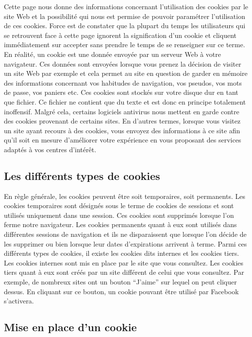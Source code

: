 Cette page nous donne des informations concernant l’utilisation des cookies par le site Web et la possibilité qui nous est permise de pouvoir paramétrer l’utilisation de ces cookies. Force est de constater que la plupart du temps les utilisateurs qui se retrouvent face à cette page ignorent la signification d’un cookie et cliquent immédiatement sur accepter sans prendre le temps de se renseigner sur ce terme. En réalité, un cookie est une donnée envoyée par un serveur Web à votre navigateur. Ces données sont envoyées lorsque vous prenez la décision de visiter un site Web par exemple et cela permet au site en question de garder en mémoire des informations concernant vos habitudes de navigation, vos pseudos, vos mots de passe, vos paniers etc. Ces cookies sont stockés sur votre disque dur en tant que fichier. Ce fichier ne contient que du texte et est donc en principe totalement inoffensif. Malgré cela, certains logiciels antivirus nous mettent en garde contre des cookies provenant de certains sites. En d’autres termes, lorsque vous visitez un site ayant recours à des cookies, vous envoyez des informations à ce site afin qu’il soit en mesure d’améliorer votre expérience en vous proposant des services adaptés à vos centres d'intérêt. 

\subsection{Les différents types de cookies}

En règle générale, les cookies peuvent être soit temporaires, soit permanents. Les cookies temporaires sont désignés sous le terme de cookies de sessions et sont utilisés uniquement dans une session. Ces cookies sont supprimés lorsque l’on ferme notre navigateur. Les cookies permanents quant à eux sont utilisés dans différentes sessions de navigation et ils ne disparaissent que lorsque l’on décide de les supprimer ou bien lorsque leur dates d’expirations arrivent à terme. Parmi ces différents types de cookies, il existe les cookies dits internes et les cookies tiers. Les cookies internes sont mis en place par le site que vous consultez. Les cookies tiers quant à eux sont créés par un site différent de celui que vous consultez. Par exemple, de nombreux sites ont un bouton “J’aime” sur lequel on peut cliquer dessus. En cliquant sur ce bouton, un cookie pouvant être utilisé par Facebook s’activera.

\subsection{Mise en place d’un cookie}

